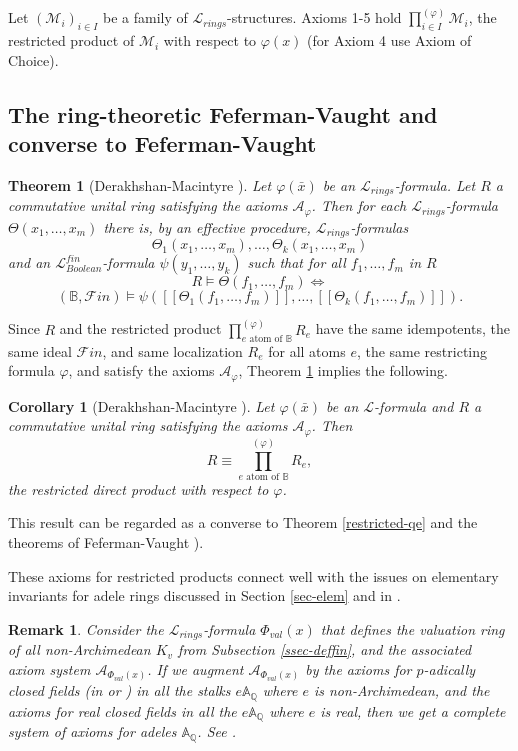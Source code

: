 \documentclass[12pt]{amsart}
\def\A{\mathbb{A}}
\def\B{\mathbb{B}}
\def\cL{\mathcal{L}}
\def\Q{\mathbb{Q}}
\def\cL{\mathcal{L}}
\def\cM{\mathcal M}
\newtheorem{thm}{Theorem}[section]
\newtheorem{cor}{Corollary}[section]
\newtheorem{remark}{Remark}[section]
\numberwithin{equation}{section}
\begin{document}
Let $(\cM_i)_{i\in I}$ be a family of $\cL_{rings}$-structures. Axioms 1-5 hold $\prod_{i\in I}^{(\varphi)} \cM_i$, the restricted product of $\cM_i$ 
with respect to $\varphi(x)$ (for Axiom 4 use Axiom of Choice).

\medskip

\subsection{\bf The ring-theoretic Feferman-Vaught and converse to Feferman-Vaught}


\begin{thm}[Derakhshan-Macintyre {\cite{DM-axioms}}]\label{main-th} Let $\varphi(\bar x)$ be an $\cL_{rings}$-formula. Let $R$ a commutative unital ring satisfying the axioms $\mathcal{A}_{\varphi}$. Then 
for each $\cL_{rings}$-formula $\Theta(x_1,\dots,x_m)$ there is, by an effective procedure, $\cL_{rings}$-formulas
$$\Theta_1(x_1,\dots,x_m),\dots,\Theta_k(x_1,\dots,x_m)$$ and an 
$\cL_{Boolean}^{fin}$-formula 
$\psi(y_1,\dots,y_k)$ such that for all $f_1,\dots,f_m$ in $R$
$$R\models \Theta(f_1,\dots,f_m) \Leftrightarrow $$
$$(\B,\mathcal{F}in)\models \psi([[\Theta_1(f_1,\dots,f_m)]],\dots,[[\Theta_k(f_1,\dots,f_m)]]).$$\end{thm}

Since $R$ and the restricted product $\prod_{e\text{~atom~of~}\B}^{(\varphi)} R_e$ have the same idempotents, the same ideal $\mathcal{F}in$, and same localization $R_e$ for all atoms $e$, the same restricting formula $\varphi$, and satisfy the axioms $\mathcal{A}_{\varphi}$, Theorem \ref{main-th} implies the following.
\begin{cor}[Derakhshan-Macintyre {\cite{DM-axioms}}] Let $\varphi(\bar x)$ be an $\cL$-formula and $R$ a commutative unital ring satisfying the axioms $\mathcal{A}_{\varphi}$. Then 
$$R \equiv \prod_{e\text{~atom~of~}\B}^{(\varphi)} R_e,$$
the restricted direct product with respect to $\varphi$.\end{cor}

This result can be regarded as a converse to Theorem \ref{restricted-qe} and the theorems of Feferman-Vaught \cite{FV}).

These axioms for restricted products connect well with the issues on elementary invariants for adele rings discussed in Section \ref{sec-elem} and in \cite{DM-ad2}. 

\begin{remark} Consider the $\cL_{rings}$-formula $\Phi_{val}(x)$ that defines the valuation ring of all non-Archimedean $K_v$ from Subsection \ref{ssec-deffin}, and the associated axiom system $\mathcal{A}_{\Phi_{val}(x)}$. If we 
augment $\mathcal{A}_{\Phi_{val}(x)}$ by the axioms for $p$-adically closed fields (in \cite{AK2} or \cite{PR-book}) in all the stalks $e\A_{\Q}$ where $e$ is non-Archimedean, and the axioms for 
real closed fields in all the $e\A_{\Q}$ where $e$ is real, then we get a complete system of axioms for adeles $\A_{\Q}$. See \cite{DM-axioms}.\end{remark}
\end{document}
